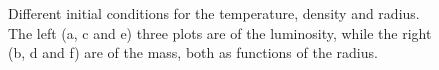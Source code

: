\documentclass[a4paper,10pt]{article}
\begin{document}
\begin{figure}[!]
\caption{Different initial conditions for the temperature, density and radius. The left (a, c and e) three plots are of the luminosity, while the right (b, d and f) are of the mass, both as functions of the radius.}
\label{fig:testing_values}
\end{figure}
\end{document}
